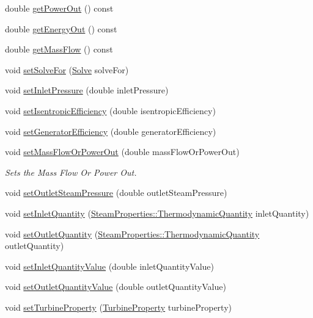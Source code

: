 \begin{DoxyCompactItemize}
\item 
double \hyperlink{class_turbine_a89585cc2fbfdbe67d539eae08c369fa2}{get\+Power\+Out} () const
\item 
double \hyperlink{class_turbine_a143fc660274e0d65ccb8fc55cc2caf83}{get\+Energy\+Out} () const
\item 
double \hyperlink{class_turbine_a4893a203dbbf9db9ca77a0b278c4c118}{get\+Mass\+Flow} () const
\item 
void \hyperlink{class_turbine_a96f54a8fc572dae6c5298289de890f4d}{set\+Solve\+For} (\hyperlink{class_turbine_a9fd7beba6c6f071e228fbe3e07969d2b}{Solve} solve\+For)
\item 
void \hyperlink{class_turbine_a04996baab9a40d449a69c737c00be8e4}{set\+Inlet\+Pressure} (double inlet\+Pressure)
\item 
void \hyperlink{class_turbine_ae67daa481ef48bcf8aef84bcccb4611d}{set\+Isentropic\+Efficiency} (double isentropic\+Efficiency)
\item 
void \hyperlink{class_turbine_a51e9c5050a5be51b86dc23e690bd3f40}{set\+Generator\+Efficiency} (double generator\+Efficiency)
\item 
void \hyperlink{class_turbine_a73522631e2eeefa8ea14d5b537e3e760}{set\+Mass\+Flow\+Or\+Power\+Out} (double mass\+Flow\+Or\+Power\+Out)
\begin{DoxyCompactList}\small\item\em Sets the Mass Flow Or Power Out. \end{DoxyCompactList}\item 
void \hyperlink{class_turbine_ab9612657de02e4523492b687917b4091}{set\+Outlet\+Steam\+Pressure} (double outlet\+Steam\+Pressure)
\item 
void \hyperlink{class_turbine_aecc05c70870fb11bbc0bb4fe5d8438bd}{set\+Inlet\+Quantity} (\hyperlink{class_steam_properties_ae0294bedf7d178c2d8fb6aed0f62fbff}{Steam\+Properties\+::\+Thermodynamic\+Quantity} inlet\+Quantity)
\item 
void \hyperlink{class_turbine_ad5ff4ba1657aac9519a6841336ec571c}{set\+Outlet\+Quantity} (\hyperlink{class_steam_properties_ae0294bedf7d178c2d8fb6aed0f62fbff}{Steam\+Properties\+::\+Thermodynamic\+Quantity} outlet\+Quantity)
\item 
void \hyperlink{class_turbine_ac01a053462c83e21ecc2158e75477542}{set\+Inlet\+Quantity\+Value} (double inlet\+Quantity\+Value)
\item 
void \hyperlink{class_turbine_ab37326068f633280de8f8144b9c8eb89}{set\+Outlet\+Quantity\+Value} (double outlet\+Quantity\+Value)
\item 
void \hyperlink{class_turbine_abb3f16cefe52f4e9c7b32b2bb17a68ee}{set\+Turbine\+Property} (\hyperlink{class_turbine_a5db4f65cf2539e3837684d53221ade12}{Turbine\+Property} turbine\+Property)
\end{DoxyCompactItemize}


